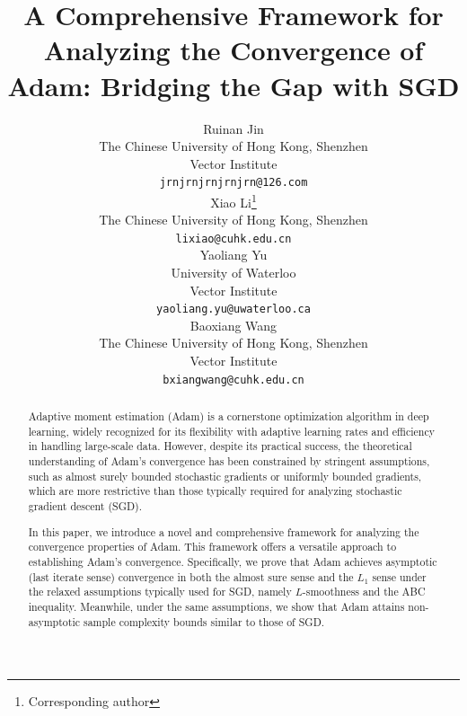 \documentclass{article} %
\title{A Comprehensive Framework for Analyzing the Convergence of Adam: Bridging the Gap with SGD}
\author{Ruinan Jin\\ %
The Chinese University of Hong Kong, Shenzhen\\
Vector Institute \\
\texttt{jrnjrnjrnjrnjrn@126.com} \\
\And
Xiao Li\thanks{Corresponding author}\\ %
The Chinese University of Hong Kong, Shenzhen\\
\texttt{lixiao@cuhk.edu.cn} \\
\And
Yaoliang Yu\\ %
University of Waterloo\\
Vector Institute \\
\texttt{yaoliang.yu@uwaterloo.ca} \\
\And
Baoxiang Wang\\ %
The Chinese University of Hong Kong, Shenzhen\\
Vector Institute \\
\texttt{bxiangwang@cuhk.edu.cn} \\
}
\begin{document}
\maketitle

\begin{abstract}

Adaptive moment estimation (Adam) is a cornerstone optimization algorithm in deep learning, widely recognized for its flexibility with adaptive learning rates and efficiency in handling large-scale data. However, despite its practical success, the theoretical understanding of Adam's convergence has been constrained by stringent assumptions, such as almost surely bounded stochastic gradients or uniformly bounded gradients, which are more restrictive than those typically required for analyzing stochastic gradient descent (SGD).

In this paper, we introduce a novel and comprehensive framework for analyzing the convergence properties of Adam. This framework offers a versatile approach to establishing Adam's convergence. Specifically, we prove that Adam achieves asymptotic (last iterate sense) convergence in both the almost sure sense and the \(L_1\) sense under the relaxed assumptions typically used for SGD, namely \(L\)-smoothness and the ABC inequality. Meanwhile, under the same assumptions, we show that Adam attains non-asymptotic sample complexity bounds similar to those of SGD.%


\end{abstract}



\end{document}
